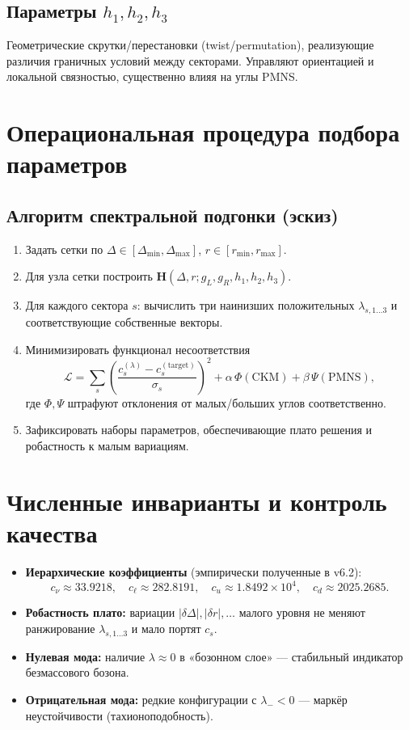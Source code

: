 \documentclass[12pt,a4paper]{article}
\theoremstyle{definition}
\theoremstyle{plain}
\theoremstyle{remark}
\newcommand{\Hbase}{\mathbf{H}}
\begin{document}
\subsection*{Параметры \(h_1,h_2,h_3\)}
Геометрические скрутки/перестановки (twist/permutation), реализующие различия граничных условий между секторами. Управляют ориентацией и локальной связностью, существенно влияя на углы PMNS.

\section{Операциональная процедура подбора параметров}
\subsection*{Алгоритм спектральной подгонки (эскиз)}
\begin{enumerate}[leftmargin=0.9cm]
  \item Задать сетки по \(\Delta\in[\Delta_{\min},\Delta_{\max}]\), \(r\in[r_{\min},r_{\max}]\).
  \item Для узла сетки построить \(\Hbase(\Delta,r;g_L,g_R,h_1,h_2,h_3)\).
  \item Для каждого сектора \(s\): вычислить три наинизших положительных \(\lambda_{s,1\ldots3}\) и соответствующие собственные векторы.
  \item Минимизировать функционал несоответствия
  \[
  \mathcal{L}=\sum_{s}\left(\frac{c_s^{(\lambda)}-c_s^{(\text{target})}}{\sigma_s}\right)^2
  + \alpha\,\Phi(\mathrm{CKM})+\beta\,\Psi(\mathrm{PMNS}),
  \]
  где \(\Phi,\Psi\) штрафуют отклонения от малых/больших углов соответственно.
  \item Зафиксировать наборы параметров, обеспечивающие плато решения и робастность к малым вариациям.
\end{enumerate}

\section{Численные инварианты и контроль качества}
\begin{itemize}[leftmargin=0.9cm]
  \item \textbf{Иерархические коэффициенты} (эмпирически полученные в v6.2):
\[
c_\nu\approx 33.9218,\quad c_\ell\approx 282.8191,\quad
c_u\approx 1.8492\times 10^{4},\quad c_d\approx 2025.2685.
\]
  \item \textbf{Робастность плато:} вариации \(|\delta \Delta|,|\delta r|,\ldots\) малого уровня не меняют ранжирование \(\lambda_{s,1\ldots3}\) и мало портят \(c_s\).
  \item \textbf{Нулевая мода:} наличие \(\lambda\approx 0\) в «бозонном слое» --- стабильный индикатор безмассового бозона.
  \item \textbf{Отрицательная мода:} редкие конфигурации с \(\lambda_{-}<0\) --- маркёр неустойчивости (тахионоподобность).
\end{itemize}
\end{document}
